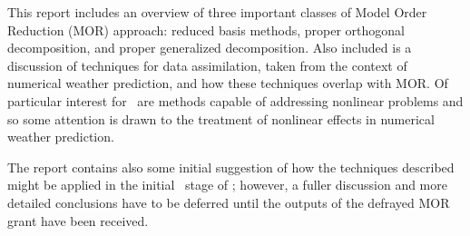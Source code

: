 This report includes an overview of three important classes of Model Order Reduction (MOR) approach: reduced basis methods, proper orthogonal decomposition, and proper generalized decomposition.  Also included is a discussion of techniques for data assimilation, taken from the context of numerical weather prediction, and how these techniques overlap with MOR.  Of particular interest for \nep\ are methods capable of addressing nonlinear problems and so some attention is drawn to the treatment of nonlinear effects in numerical weather prediction.

The report contains also some initial suggestion of how the techniques described might be applied in the initial \papp\ stage of \nep; however, a fuller discussion and more detailed conclusions have to be deferred until the outputs of the defrayed MOR grant have been received.
